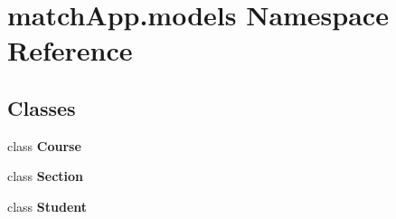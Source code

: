 \section{match\+App.\+models Namespace Reference}
\label{namespacematch_app_1_1models}
\subsection*{Classes}
\begin{DoxyCompactItemize}
\item 
class {\bf Course}
\item 
class {\bf Section}
\item 
class {\bf Student}
\end{DoxyCompactItemize}
